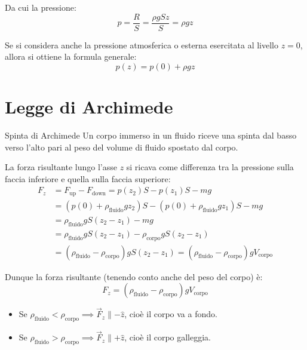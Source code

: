 Da cui la pressione:
\begin{equation}
p = \frac{R}{S} = \frac{\rho g S z}{S} = \rho g z
\end{equation}

Se si considera anche la pressione atmosferica o esterna esercitata al livello $z=0$, allora si ottiene la formula generale:
\begin{equation}
\boxed{p(z) = p(0) + \rho g z}
\end{equation}

\section{Legge di Archimede}
\begin{teorema}{Spinta di Archimede}
Un corpo immerso in un fluido riceve una spinta dal basso verso l'alto pari al peso del volume di fluido spostato dal corpo.
\end{teorema}

\medskip
La forza risultante lungo l'asse $z$ si ricava come differenza tra la pressione sulla faccia inferiore e quella sulla faccia superiore:
\begin{align*}
F_z &= F_{\text{up}} - F_{\text{down}} = p(z_2)S - p(z_1)S - mg \\
&= (p(0) + \rho_{\text{fluido}} g z_2)S - (p(0) + \rho_{\text{fluido}} g z_1)S - mg \\
&= \rho_{\text{fluido}} g S (z_2 - z_1) - mg \\
&= \rho_{\text{fluido}} g S (z_2 - z_1) - \rho_{\text{corpo}} g S (z_2 - z_1) \\
&= (\rho_{\text{fluido}} - \rho_{\text{corpo}}) g S (z_2 - z_1) = (\rho_{\text{fluido}} - \rho_{\text{corpo}}) g V_{\text{corpo}}
\end{align*}

Dunque la forza risultante (tenendo conto anche del peso del corpo) è:
\begin{equation}
\boxed{F_z = (\rho_{\text{fluido}} - \rho_{\text{corpo}}) g V_{\text{corpo}}}
\end{equation}

\begin{itemize}
    \item Se $\rho_{\text{fluido}} < \rho_{\text{corpo}} \implies \vec{F}_z \parallel -\hat{z}$, cioè il corpo va a fondo.
    \item Se $\rho_{\text{fluido}} > \rho_{\text{corpo}} \implies \vec{F}_z \parallel +\hat{z}$, cioè il corpo galleggia.
\end{itemize}

